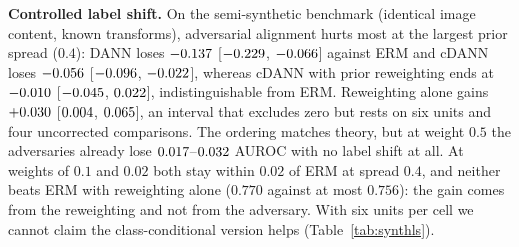 \documentclass[10pt]{article}
\newcommand{\erm}{ERM}
\begin{document}
\textbf{Controlled label shift.} On the semi-synthetic benchmark (identical image content, known transforms), adversarial alignment hurts most at the largest prior spread ($0.4$): DANN loses $-0.137$ [$-0.229$, $-0.066$] against \erm{} and cDANN loses $-0.056$ [$-0.096$, $-0.022$], whereas cDANN with prior reweighting ends at $-0.010$ [$-0.045$, $0.022$], indistinguishable from \erm{}. Reweighting alone gains $+0.030$ [$0.004$, $0.065$], an interval that excludes zero but rests on six units and four uncorrected comparisons. The ordering matches theory, but at weight $0.5$ the adversaries already lose $0.017$--$0.032$ AUROC with no label shift at all. At weights of $0.1$ and $0.02$ both stay within $0.02$ of \erm{} at spread $0.4$, and neither beats \erm{} with reweighting alone ($0.770$ against at most $0.756$): the gain comes from the reweighting and not from the adversary. With six units per cell we cannot claim the class-conditional version helps (Table~\ref{tab:synthls}).
\begin{table}[t]\centering\scriptsize

\caption{Semi-synthetic label-shift sweep: held-out AUROC (virtual sites $V0,V2,V4$, two seeds, adversary weight $0.5$).}\label{tab:synthls}
\end{table}
\end{document}
